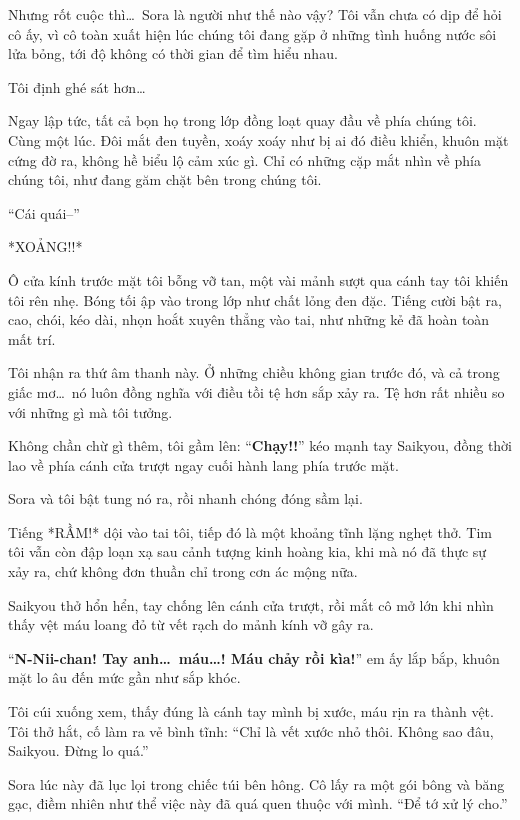 \documentclass[../main.tex]{subfiles}
\begin{document}
Nhưng rốt cuộc thì\dots\ Sora là người như thế nào vậy? Tôi vẫn chưa có dịp để hỏi cô ấy, vì cô toàn xuất hiện lúc chúng tôi đang gặp ở những tình huống nước sôi lửa bỏng, tới độ không có thời gian để tìm hiểu nhau.

Tôi định ghé sát hơn\dots


Ngay lập tức, tất cả bọn họ trong lớp đồng loạt quay đầu về phía chúng tôi. Cùng một lúc. Đôi mắt đen tuyền, xoáy xoáy như bị ai đó điều khiển, khuôn mặt cứng đờ ra, không hề biểu lộ cảm xúc gì. Chỉ có những cặp mắt nhìn về phía chúng tôi, như đang găm chặt bên trong chúng tôi.

``Cái quái--''

*XOẢNG!!*

Ô cửa kính trước mặt tôi bỗng vỡ tan, một vài mảnh sượt qua cánh tay tôi khiến tôi rên nhẹ. Bóng tối ập vào trong lớp như chất lỏng đen đặc. Tiếng cười bật ra, cao, chói, kéo dài, nhọn hoắt xuyên thẳng vào tai, như những kẻ đã hoàn toàn mất trí.


Tôi nhận ra thứ âm thanh này. Ở những chiều không gian trước đó, và cả trong giấc mơ\dots\ nó luôn đồng nghĩa với điều tồi tệ hơn sắp xảy ra. Tệ hơn rất nhiều so với những gì mà tôi tưởng.

Không chần chừ gì thêm, tôi gầm lên: ``\textbf{Chạy!!}'' kéo mạnh tay Saikyou, đồng thời lao về phía cánh cửa trượt ngay cuối hành lang phía trước mặt.

Sora và tôi bật tung nó ra, rồi nhanh chóng đóng sầm lại.

Tiếng *RẦM!* dội vào tai tôi, tiếp đó là một khoảng tĩnh lặng nghẹt thở. Tim tôi vẫn còn đập loạn xạ sau cảnh tượng kinh hoàng kia, khi mà nó đã thực sự xảy ra, chứ không đơn thuần chỉ trong cơn ác mộng nữa.

Saikyou thở hổn hển, tay chống lên cánh cửa trượt, rồi mắt cô mở lớn khi nhìn thấy vệt máu loang đỏ từ vết rạch do mảnh kính vỡ gây ra.

``\textbf{N-Nii-chan! Tay anh\dots\ máu\dots! Máu chảy rồi kìa!}'' em ấy lắp bắp, khuôn mặt lo âu đến mức gần như sắp khóc.

Tôi cúi xuống xem, thấy đúng là cánh tay mình bị xước, máu rịn ra thành vệt. Tôi thở hắt, cố làm ra vẻ bình tĩnh: ``Chỉ là vết xước nhỏ thôi. Không sao đâu, Saikyou. Đừng lo quá.''

Sora lúc này đã lục lọi trong chiếc túi bên hông. Cô lấy ra một gói bông và băng gạc, điềm nhiên như thể việc này đã quá quen thuộc với mình. ``Để tớ xử lý cho.''
\end{document}
